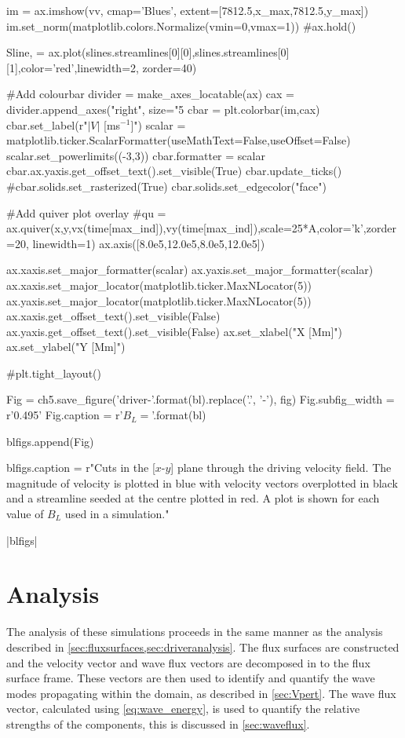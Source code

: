 \begin{pycode}[chapter5]
    im = ax.imshow(vv, cmap='Blues', extent=[7812.5,x_max,7812.5,y_max])
    im.set_norm(matplotlib.colors.Normalize(vmin=0,vmax=1))
    #ax.hold()
    
    Sline, = ax.plot(slines.streamlines[0][0],slines.streamlines[0][1],color='red',linewidth=2, zorder=40)
    
    #Add colourbar
    divider = make_axes_locatable(ax)
    cax = divider.append_axes("right", size="5%
    cbar = plt.colorbar(im,cax)
    cbar.set_label(r"$|V|$ [ms$^{-1}$]")
    scalar = matplotlib.ticker.ScalarFormatter(useMathText=False,useOffset=False)
    scalar.set_powerlimits((-3,3))
    cbar.formatter = scalar
    cbar.ax.yaxis.get_offset_text().set_visible(True)
    cbar.update_ticks()
    #cbar.solids.set_rasterized(True)
    cbar.solids.set_edgecolor("face")
    
    #Add quiver plot overlay
    #qu = ax.quiver(x,y,vx(time[max_ind]),vy(time[max_ind]),scale=25*A,color='k',zorder=20, linewidth=1)
    ax.axis([8.0e5,12.0e5,8.0e5,12.0e5])
    
    ax.xaxis.set_major_formatter(scalar)
    ax.yaxis.set_major_formatter(scalar)
    ax.xaxis.set_major_locator(matplotlib.ticker.MaxNLocator(5))
    ax.yaxis.set_major_locator(matplotlib.ticker.MaxNLocator(5))
    ax.xaxis.get_offset_text().set_visible(False)
    ax.yaxis.get_offset_text().set_visible(False)
    ax.set_xlabel("X [Mm]")
    ax.set_ylabel("Y [Mm]")
    
    #plt.tight_layout()
    
    Fig = ch5.save_figure('driver-{}'.format(bl).replace('.', '-'), fig)
    Fig.subfig_width = r'0.495\columnwidth'
    Fig.caption = r'$B_L = {}$'.format(bl)
    
    blfigs.append(Fig)
   
blfigs.caption = r"Cuts in the [$x$-$y$] plane through the driving velocity field. The magnitude of velocity is plotted in blue with velocity vectors overplotted in black and a streamline seeded at the centre plotted in red. A plot is shown for each value of $B_L$ used in a simulation."

\end{pycode}

\py[chapter5]|blfigs|

\section{Analysis}\label{sec:analysis}

The analysis of these simulations proceeds in the same manner as the analysis described in \cref{sec:fluxsurfaces,sec:driveranalysis}.
The flux surfaces are constructed and the velocity vector and wave flux vectors are decomposed in to the flux surface frame.
These vectors are then used to identify and quantify the wave modes propagating within the domain, as described in \cref{sec:Vpert}.
The wave flux vector, calculated using \cref{eq:wave_energy}, is used to quantify the relative strengths of the components, this is discussed in \cref{sec:waveflux}.

